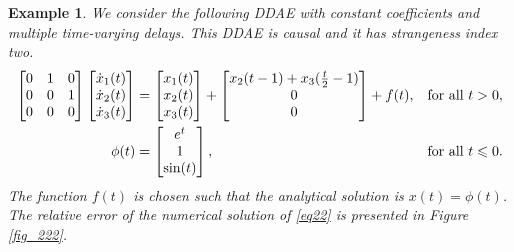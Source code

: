 \documentclass[final,reqno]{siamltex}
\newtheorem{example}[theorem]{Example}
\begin{document}
\begin{example} 
We consider the following DDAE with constant coefficients and multiple time-varying delays. This DDAE is causal and it has 
strangeness index two.
%
\begin{equation}\label{eq22}
\begin{aligned}
\m{
0&1&0\\
0&0&1 \\
0&0&0 
}
\m{\dot{x}_1(t) \\ \dot{x}_2(t) \\ \dot{x}_3(t)} &=
\m{x_1(t) \\ x_2(t) \\ x_3(t)} + 
\m{
x_2(t-1)+x_3(\tfrac t2-1)\\
0\\
0
}
+f(t), && \mbox{for all } t>0,\\
\phi(t) &=
\m{
e^t\\
1\\
\sin(t)
},
&& \mbox{for all } t \leq 0.
\end{aligned}
\end{equation}
The function $f(t)$ is chosen such that the analytical solution is $x(t)=\phi(t)$. The relative error of the numerical solution of \eqref{eq22} is presented in Figure \ref{fig_222}.
\end{example}
\end{document}
